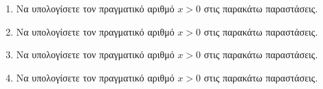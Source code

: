 \documentclass[twoside,nofonts,internet]{askhseis}
\begin{document}
\begin{enumerate}
\begin{multicols}{2}
\begin{rlist}
\end{rlist}
\end{multicols}
\item Να υπολογίσετε τον πραγματικό αριθμό $ x>0 $ στις παρακάτω παραστάσεις.
\begin{multicols}{2}
\end{multicols}
\item Να υπολογίσετε τον πραγματικό αριθμό $ x>0 $ στις παρακάτω παραστάσεις.
\begin{multicols}{2}
\end{multicols}
\item Να υπολογίσετε τον πραγματικό αριθμό $ x>0 $ στις παρακάτω παραστάσεις.
\begin{multicols}{2}
\end{multicols}
\item Να υπολογίσετε τον πραγματικό αριθμό $ x>0 $ στις παρακάτω παραστάσεις.
\begin{multicols}{2}
\end{multicols}
\end{enumerate}
\end{document}
